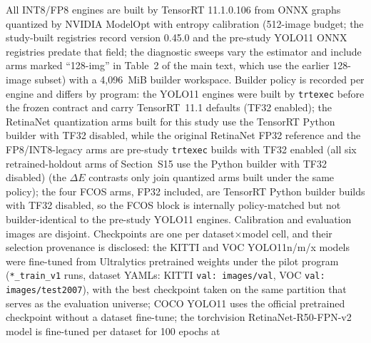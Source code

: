 \documentclass[10pt]{article}
\newcommand{\Jclean}{\mathrm{J95}}
\begin{document}
\begin{table}[h]
\centering\small
\caption{RetinaNet arms under the frozen protocol (COCO-style AP on converted
annotations). Corrupt: equal weight over the 12 corruption--severity cells.
$\Jclean$: codec-control clean; the FP32 and legacy arms predate the codec
control (dashes). INT8-legacy also differs from the matched arms in builder
policy (TF32 enabled by default versus disabled); Table~2 of the main text
gives the controlled preprocessing-only comparison. Bold: the standard INT8
recipe and its selective repair.}
\label{tab:retinanet}
{\setlength{\tabcolsep}{4pt}}
\end{table}

All INT8/FP8 engines are built by TensorRT 11.1.0.106 from ONNX graphs
quantized by NVIDIA ModelOpt with entropy calibration (512-image budget;
the study-built registries record version 0.45.0 and the pre-study YOLO11
ONNX registries predate that field;
the diagnostic sweeps vary the estimator and include arms marked
``128-img'' in Table~2 of the main text, which use the earlier 128-image
subset)
with a 4,096~MiB builder workspace. Builder policy is recorded per engine
and differs by program: the YOLO11 engines were built by \texttt{trtexec}
before the frozen contract and carry TensorRT~11.1 defaults (TF32 enabled);
the RetinaNet quantization arms built for this study use the TensorRT Python
builder with TF32 disabled, while the original RetinaNet FP32 reference and the
FP8/INT8-legacy arms are pre-study \texttt{trtexec} builds with TF32 enabled (all six
retrained-holdout arms of Section~S15 use the Python builder with TF32 disabled)
(the $\Delta E$ contrasts only join quantized arms built under the same
policy); the four FCOS arms, FP32 included, are TensorRT Python builder
builds with TF32 disabled, so the FCOS block is internally policy-matched
but not builder-identical to the pre-study YOLO11 engines.
Calibration and evaluation images are disjoint. Checkpoints are one per
dataset$\times$model cell, and their selection provenance is disclosed: the
KITTI and VOC YOLO11n/m/x models were fine-tuned from Ultralytics pretrained
weights under the pilot program (\texttt{*\_train\_v1} runs, dataset YAMLs:
KITTI \texttt{val:\,images/val}, VOC \texttt{val:\,images/test2007}), with
the best checkpoint taken on the same
partition that serves as the evaluation universe; COCO YOLO11 uses the
official pretrained checkpoint without a dataset fine-tune; the torchvision
RetinaNet-R50-FPN-v2 model is fine-tuned per dataset for 100 epochs at
\end{document}
